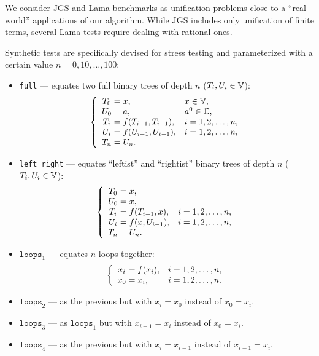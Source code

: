 We consider JGS and Lama benchmarks as unification problems close to a ``real-world'' applications of our algorithm. While JGS includes only unification of finite terms,
several Lama tests require dealing with rational ones.

Synthetic tests are specifically devised for stress testing and parameterized with a certain value $n = 0, 10, \dots, 100$:

\begin{itemize}
    \item \texttt{full} --- equates two full binary trees of depth $n$ ($T_i, U_i \in \mathbb{V}$):
    \begin{equation*}
        \left\{
        \begin{array}{c@{{}={}}ll}
            T_0 & x, & x \in \V, \\
            U_0 & a, & a^0 \in \C, \\
            T_i & f(T_{i-1}, T_{i-1}), & i = 1, 2, \dots, n, \\
            U_i & f(U_{i-1}, U_{i-1}), & i = 1, 2, \dots, n, \\
            T_n & U_n. \\
        \end{array}
        \right.
    \end{equation*}
    \item \texttt{left\_right} --- equates ``leftist'' and ``rightist'' binary trees of depth $n$ ($T_i, U_i \in \mathbb{V}$):
    \begin{equation*}
        \left\{
        \begin{array}{c@{{}={}}ll}
            T_0 & x, \\
            U_0 & x, \\
            T_i & f(T_{i-1}, x), & i = 1, 2, \dots, n, \\
            U_i & f(x, U_{i-1}), & i = 1, 2, \dots, n, \\
            T_n & U_n. \\
        \end{array}
        \right.
    \end{equation*}
    \item $\texttt{loops}_1$ --- equates $n$ loops together:
    \begin{equation*}
        \left\{
        \begin{array}{c@{{}={}}ll}
            x_i & f(x_i), & i = 1, 2, \dots, n, \\
            x_0 & x_i, & i = 1, 2, \dots, n. \\
        \end{array}
        \right.
    \end{equation*}
    \item $\texttt{loops}_2$ --- as the previous but with $x_i = x_0$ instead of $x_0 = x_i$.
    \item $\texttt{loops}_3$ --- as $\texttt{loops}_1$ but with $x_{i-1} = x_i$ instead of $x_0 = x_i$.
    \item $\texttt{loops}_4$ --- as the previous but with $x_i = x_{i-1}$ instead of $x_{i-1} = x_i$.
\end{itemize} 

